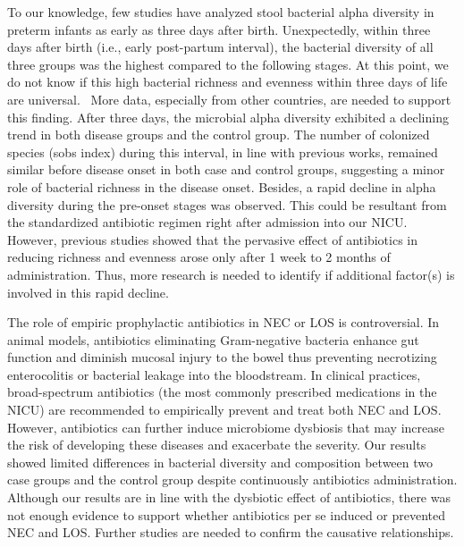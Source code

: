 \documentclass[fleqn,10pt, lineno]{wlpeerj} %
\begin{document}
To our knowledge, few studies have analyzed stool bacterial alpha diversity in preterm infants as early as three days after birth. Unexpectedly, within three days after birth (i.e., early post-partum interval), the bacterial diversity of all three groups was the highest compared to the following stages. At this point, we do not know if this high bacterial richness and evenness within three days of life are universal.  More data, especially from other countries, are needed to support this finding. After three days, the microbial alpha diversity exhibited a declining trend in both disease groups and the control group. The number of colonized species (sobs index) during this interval, in line with previous works\citep{mai2011fecal, mai2013distortions}, remained similar before disease onset in both case and control groups, suggesting a minor role of bacterial richness in the disease onset. Besides, a rapid decline in alpha diversity during the pre-onset stages was observed.  This could be resultant from the standardized antibiotic regimen right after admission into our NICU. However, previous studies showed that the pervasive effect of antibiotics in reducing richness and evenness arose only after 1 week to 2 months of administration\citep{digiulio2008microbial, dethlefsen2011incomplete, fouhy2012high, greenwood2014early, tanaka2009influence}. Thus, more research is needed to identify if additional factor(s) is involved in this rapid decline.

The role of empiric prophylactic antibiotics in NEC or LOS is controversial. In animal models, antibiotics eliminating Gram-negative bacteria enhance gut function and diminish mucosal injury to the bowel thus preventing necrotizing enterocolitis or bacterial leakage into the bloodstream\citep{carlisle2011gram, jensen2013antibiotics, birck2015enteral}. In clinical practices, broad-spectrum antibiotics (the most commonly prescribed medications in the NICU) are recommended to empirically prevent and treat both NEC and LOS\citep{bury2001enteral, brook2008microbiology, kimberlin2018red}. However, antibiotics can further induce microbiome dysbiosis that may increase the risk of developing these diseases and exacerbate the severity\citep{gibson2015antibiotics, kuppala2011prolonged, martinez2017early, cantey2018early}. Our results showed limited differences in bacterial diversity and composition between two case groups and the control group despite continuously antibiotics administration.  Although our results are in line with the dysbiotic effect of antibiotics, there was not enough evidence to support whether antibiotics per se induced or prevented NEC and LOS. Further studies are needed to confirm the causative relationships.
\end{document}
